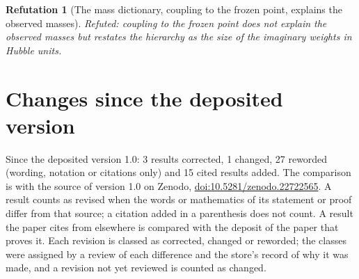 \documentclass[11pt]{article}
\newtheorem{refutation}[theorem]{Refutation}
\theoremstyle{definition}
\theoremstyle{plain}
\begin{document}
\begin{refutation}[The mass dictionary, coupling to the frozen point, explains the observed masses]\label{c:refuted.the-mass-dictionary-coupling-to-the-frozen-point}
Refuted: coupling to the frozen point does not explain the observed masses but restates the hierarchy as the size of the imaginary weights in Hubble units.
\end{refutation}

\section*{Changes since the deposited version}
Since the deposited version 1.0: 3 results corrected, 1 changed, 27 reworded (wording, notation or citations only) and 15 cited results added. The comparison is with the source of version 1.0 on Zenodo, \href{https://doi.org/10.5281/zenodo.22722565}{doi:10.5281/zenodo.22722565}. A result counts as revised when the words or mathematics of its statement or proof differ from that source; a citation added in a parenthesis does not count. A result the paper cites from elsewhere is compared with the deposit of the paper that proves it. Each revision is classed as corrected, changed or reworded; the classes were assigned by a review of each difference and the store's record of why it was made, and a revision not yet reviewed is counted as changed.
\end{document}
